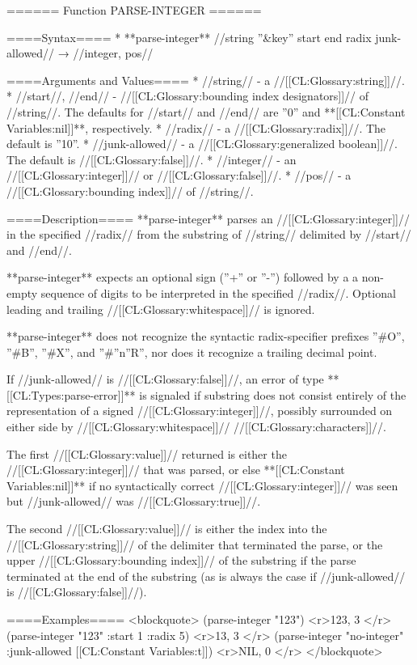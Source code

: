 ====== Function PARSE-INTEGER ======

====Syntax====
  * **parse-integer** //string ''&key'' start end radix junk-allowed// → //integer, pos//

====Arguments and Values====
  * //string// - a //[[CL:Glossary:string]]//.
  * //start//, //end// - //[[CL:Glossary:bounding index designators]]// of //string//. The defaults for //start// and //end// are ''0'' and **[[CL:Constant Variables:nil]]**, respectively.
  * //radix// - a //[[CL:Glossary:radix]]//. The default is ''10''.
  * //junk-allowed// - a //[[CL:Glossary:generalized boolean]]//. The default is //[[CL:Glossary:false]]//.
  * //integer// - an //[[CL:Glossary:integer]]// or //[[CL:Glossary:false]]//.
  * //pos// - a //[[CL:Glossary:bounding index]]// of //string//.

====Description====
**parse-integer** parses an //[[CL:Glossary:integer]]// in the specified //radix// from the substring of //string// delimited by //start// and //end//.

**parse-integer** expects an optional sign (''+'' or ''-'') followed by a a non-empty sequence of digits to be interpreted in the specified //radix//. Optional leading and trailing //[[CL:Glossary:whitespace]]// is ignored.

**parse-integer** does not recognize the syntactic radix-specifier prefixes ''#O'', ''#B'', ''#X'', and ''#''n''R'', nor does it recognize a trailing decimal point.

If //junk-allowed// is //[[CL:Glossary:false]]//, an error of type **[[CL:Types:parse-error]]** is signaled if substring does not consist entirely of the representation of a signed //[[CL:Glossary:integer]]//, possibly surrounded on either side by //[[CL:Glossary:whitespace]]// //[[CL:Glossary:characters]]//.

The first //[[CL:Glossary:value]]// returned is either the //[[CL:Glossary:integer]]// that was parsed, or else **[[CL:Constant Variables:nil]]** if no syntactically correct //[[CL:Glossary:integer]]// was seen but //junk-allowed// was //[[CL:Glossary:true]]//.

The second //[[CL:Glossary:value]]// is either the index into the //[[CL:Glossary:string]]// of the delimiter that terminated the parse, or the upper //[[CL:Glossary:bounding index]]// of the substring if the parse terminated at the end of the substring (as is always the case if //junk-allowed// is //[[CL:Glossary:false]]//).

====Examples==== 
<blockquote> 
(parse-integer "123") <r>123, 3 </r>
(parse-integer "123" :start 1 :radix 5) <r>13, 3 </r>
(parse-integer "no-integer" :junk-allowed [[CL:Constant Variables:t]]) <r>NIL, 0 </r>
</blockquote>

